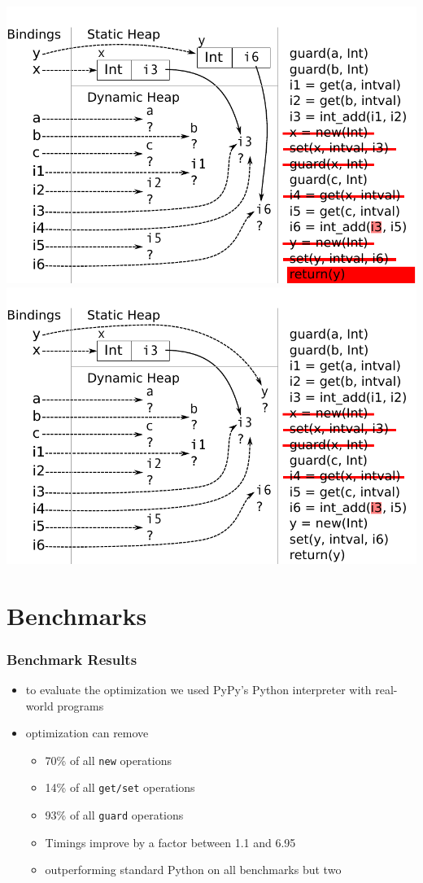 \documentclass[utf8x]{beamer}
\begin{document}
\begin{frame}[plain]
{\includegraphics[scale=0.8]{figures/ex15}}
{\includegraphics[scale=0.8]{figures/ex16}}
\end{frame}

\section{Benchmarks}

\begin{frame}
  \frametitle{Benchmark Results}
  \begin{itemize}
      \item to evaluate the optimization we used PyPy's Python interpreter with real-world programs
      \item optimization can remove
      \begin{itemize}
          \item 70\% of all \texttt{new} operations
          \item 14\% of all \texttt{get/set} operations
          \item 93\% of all \texttt{guard} operations
      \pause
      \item Timings improve by a factor between 1.1 and 6.95
      \item outperforming standard Python on all benchmarks but two
      \end{itemize}
  \end{itemize}
\end{frame}
\end{document}

